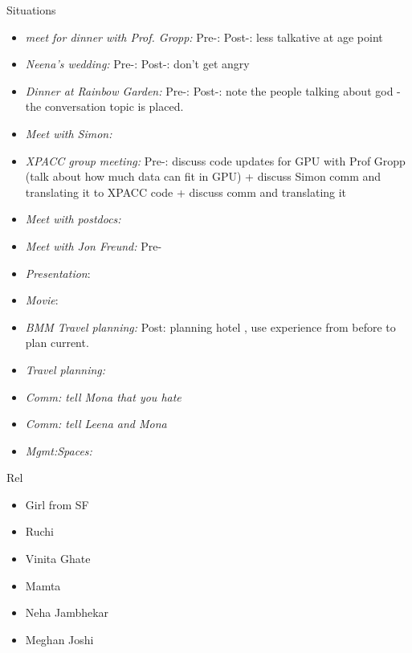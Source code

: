 \documentclass[serif, mathserif, final]{beamer}
\begin{document}
\begin{frame}
\begin{columns}
\begin{column}{0.20\linewidth}
\begin{block}{Situations}
        \begin{itemize}
        \tiny \item \tiny \textit{meet for dinner with Prof. Gropp:} Pre-:
          Post-: less talkative at age point 
        \item \tiny \textit{Neena's wedding:} Pre-:  Post-:  don't get angry
        \item \tiny \textit{Dinner at Rainbow Garden:} Pre-:  Post-:
          note the people talking about god - the conversation topic
          is placed.           
        \item \tiny \textit{Meet with Simon:}
        \item \tiny \textit{XPACC group meeting:} Pre-: discuss code
          updates for GPU with Prof Gropp (talk about how much data
          can fit in GPU) + discuss Simon comm and translating it to
          XPACC code + discuss comm and translating it 
        \item \tiny \textit{Meet with postdocs:}
        \item \tiny \textit{Meet with Jon Freund:} Pre- 
        \item \tiny \textit{Presentation}:             
        \item \tiny \textit{Movie}:

        \item \tiny \textit{BMM Travel planning:} Post: planning
          hotel , use experience from before to plan current. 
        \item \tiny \textit{Travel planning:}           
        \item \tiny \textit{Comm: tell Mona that you hate} 
        \item \tiny \textit{Comm: tell Leena and Mona} 
        \item \tiny \textit{Mgmt:Spaces:}
    \end{itemize} 

  \end{block}

\begin{block}{Rel}
\begin{itemize} 
\small \item \small Girl from SF 
\small \item \small Ruchi 
\small \item \small Vinita Ghate 
\small \item \small Mamta
\small \item \small Neha Jambhekar 
\small \item \small Meghan Joshi 
\end{itemize} 
\end{block} 
\end{column}%

\end{columns}

\end{frame}
\end{document}
